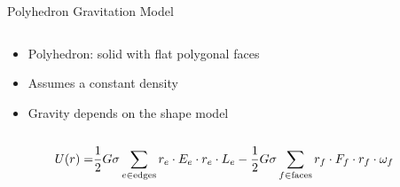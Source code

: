 \begin{frame}{Polyhedron Gravitation Model}

\begin{columns}
\begin{column}{0.5\textwidth}
\begin{itemize}
    \item Polyhedron: solid with flat polygonal faces
    \item Assumes a constant density
    \item Gravity depends on the shape model
\end{itemize}
\end{column}
\begin{column}{0.5\textwidth}
    \resizebox{\columnwidth}{!}{%
    
}
\end{column}
\end{columns}
\pause
\begin{align*}
    U(r) =& \frac{1}{2} G \sigma \sum_{e \in \text{edges}} r_e \cdot E_e \cdot r_e \cdot L_e - \frac{1}{2}G \sigma \sum_{f \in \text{faces}} r_f \cdot F_f \cdot r_f \cdot \omega_f 
\end{align*}
\end{frame}
